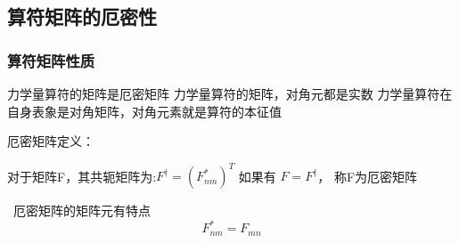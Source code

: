 \subsection{算符矩阵的厄密性}

\begin{frame} 
    \frametitle{算符矩阵性质} 
    \begin{enumerate}
    \Item  力学量算符的矩阵是厄密矩阵 
    \Item  力学量算符的矩阵，对角元都是实数
    \Item  力学量算符在自身表象是对角矩阵，对角元素就是算符的本征值
    \end{enumerate}
\end{frame}

\begin{frame} 
    \begin{tcolorbox1}{厄密矩阵定义：}
        \begin{itemize}
        \Item 对于矩阵F，其共轭矩阵为:$F^{\dagger } =(F_{nm} ^*)^T$
        \Item 如果有 $F= F^{\dagger }$， 称F为厄密矩阵
        \end{itemize}
    \Tips~厄密矩阵的矩阵元有特点 $$  F_{nm}^* = F_{mn}  $$
    \end{tcolorbox1}
\end{frame}


